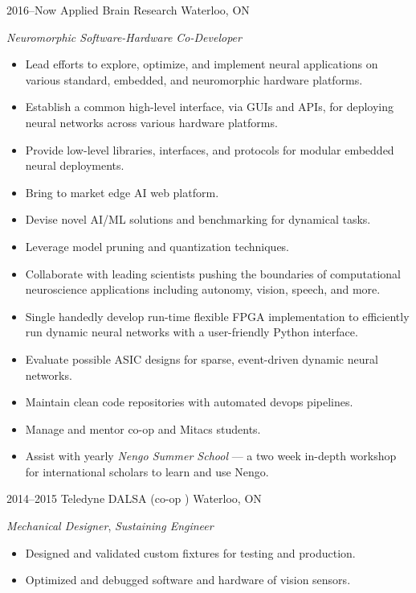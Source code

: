 \documentclass[a4paper,nocolors]{cv-friggeri-ben}
\begin{document}
\begin{entrylist}

\entry
    {2016--Now}
    {Applied Brain Research}
    {Waterloo, ON}
    {\emph{Neuromorphic Software-Hardware Co-Developer}
    \begin{itemize}
        \item Lead efforts to explore, optimize, and implement neural
            applications on various standard, embedded, and neuromorphic
            hardware platforms.
        \item Establish a common high-level interface, via GUIs and APIs, for
            deploying neural networks across various hardware platforms.
        \item Provide low-level libraries, interfaces, and protocols for
            modular embedded neural deployments.
        \item Bring to market edge AI web platform.
        \item Devise novel AI/ML solutions and benchmarking for dynamical tasks.
        \item Leverage model pruning and quantization techniques.
        \item Collaborate with leading scientists pushing the boundaries of
            computational neuroscience applications including autonomy, vision,
            speech, and more.
        \item Single handedly develop run-time flexible FPGA implementation to
            efficiently run dynamic neural networks with a user-friendly Python
            interface.
        \item Evaluate possible ASIC designs for sparse, event-driven dynamic
            neural networks.
        \item Maintain clean code repositories with automated devops pipelines.
        \item Manage and mentor co-op and Mitacs students.
        \item Assist with yearly \emph{Nengo Summer School} --- a two week
            in-depth workshop for international scholars to learn and use Nengo.
    \end{itemize}}

\entry
    {2014--2015}
    {Teledyne DALSA {\normalfont (co-op )}}
    {Waterloo, ON}
    {\emph{Mechanical Designer}, \emph{Sustaining Engineer}
    \begin{itemize}
        \item Designed and validated custom fixtures for testing and production.
        \item Optimized and debugged software and hardware of vision sensors.
    \end{itemize}}


\end{entrylist}
\end{document}
